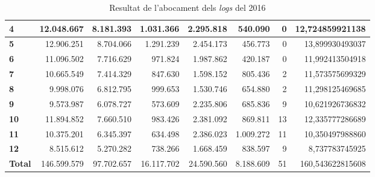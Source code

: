 \begin{table}[h!]
\begin{adjustbox}{width=1.2\textwidth, center}
\begin{tabular}{|l|r|r|r|r|r|r|r|}
            \textbf{4}     & 12.048.667  & 8.181.393  & 1.031.366  & 2.295.818  & 540.090   & 0  & 12,724859921138  \\
            \midrule
            \textbf{5}     & 12.906.251  & 8.704.066  & 1.291.239  & 2.454.173  & 456.773   & 0  & 13,899930493037  \\
            \textbf{6}     & 11.096.502  & 7.716.629  & 971.824    & 1.987.862  & 420.187   & 0  & 11,992413504918  \\
            \textbf{7}     & 10.665.549  & 7.414.329  & 847.630    & 1.598.152  & 805.436   & 2  & 11,573575699329  \\
            \textbf{8}     & 9.998.076   & 6.812.795  & 999.653    & 1.530.746  & 654.880   & 2  & 11,298125469685  \\
            \midrule
            \textbf{9}     & 9.573.987   & 6.078.727  & 573.609    & 2.235.806  & 685.836   & 9  & 10,621926736832  \\
            \textbf{10}    & 11.894.852  & 7.660.510  & 983.426    & 2.381.092  & 869.811   & 13 & 12,335777286689  \\
            \textbf{11}    & 10.375.201  & 6.345.397  & 634.498    & 2.386.023  & 1.009.272 & 11 & 10,350497988860  \\
            \textbf{12}    & 8.515.612   & 5.270.282  & 738.266    & 1.668.459  & 838.597   & 9  & 8,737783745925   \\
            \midrule
            \textbf{Total} & 146.599.579 & 97.702.657 & 16.117.702 & 24.590.560 & 8.188.609 & 51 & 160,543622815608 \\
            \bottomrule
        \end{tabular}
    \end{adjustbox}
    \caption{Resultat de l'abocament dels \textit{logs} del 2016}
    \label{tab:logs-table-2016}
\end{table}
